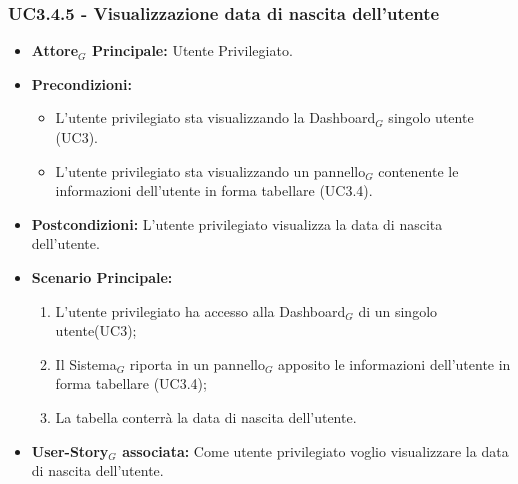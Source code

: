 \documentclass[10pt]{article}
\begin{document}
\begin{justify}
\subsubsection{\textbf{UC3.4.5 - Visualizzazione data di nascita dell'utente}}
\label{UC3.4.5}
\begin{itemize}
     \item \textbf{Attore$_G$ Principale:} Utente Privilegiato.
     \item \textbf{Precondizioni:}
        \begin{itemize}
    	\item L'utente privilegiato sta visualizzando la Dashboard$_G$ singolo utente (UC3).
          \item L'utente privilegiato sta visualizzando un pannello$_G$ contenente le informazioni dell'utente in forma tabellare (UC3.4).
        \end{itemize}
      \item \textbf{Postcondizioni:} L'utente privilegiato visualizza la data di nascita dell'utente. 
      \item \textbf{Scenario Principale:}
        \begin{enumerate}
            \item L'utente privilegiato ha accesso alla Dashboard$_G$ di un singolo utente(UC3);
            \item Il Sistema$_G$ riporta  in un pannello$_G$ apposito le informazioni dell'utente in forma tabellare (UC3.4);
            \item La tabella conterrà la data di nascita dell'utente.
        \end{enumerate}
     \item \textbf{User-Story$_G$ associata:}
       Come utente privilegiato voglio visualizzare la data di nascita dell'utente.
\end{itemize}


\end{justify}
\end{document}
